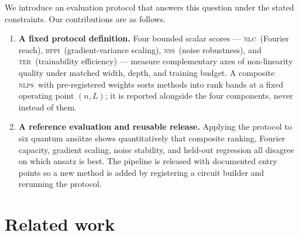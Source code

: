 \documentclass{article}
\newcommand{\nlc}{\textsc{nlc}}
\newcommand{\bppi}{\textsc{bppi}}
\newcommand{\nss}{\textsc{nss}}
\newcommand{\ter}{\textsc{ter}}
\newcommand{\nlps}{\textsc{nlps}}
\begin{document}
We introduce an evaluation protocol that answers this question under the stated constraints.
Our contributions are as follows.
\begin{enumerate}
    \item \textbf{A fixed protocol definition.}
    Four bounded scalar scores — \nlc\ (Fourier reach), \bppi\ (gradient-variance scaling), \nss\ (noise robustness), and \ter\ (trainability efficiency) — measure complementary axes of non-linearity quality under matched width, depth, and training budget.
    A composite \nlps\ with pre-registered weights sorts methods into rank bands at a fixed operating point $(n,L)$; it is reported alongside the four components, never instead of them.
    \item \textbf{A reference evaluation and reusable release.}
    Applying the protocol to six quantum ans\"atze shows quantitatively that composite ranking, Fourier capacity, gradient scaling, noise stability, and held-out regression all disagree on which ansatz is best. The pipeline is released with documented entry points so a new method is added by registering a circuit builder and rerunning the protocol.
\end{enumerate}

\section{Related work}
\label{sec:related}
\end{document}
